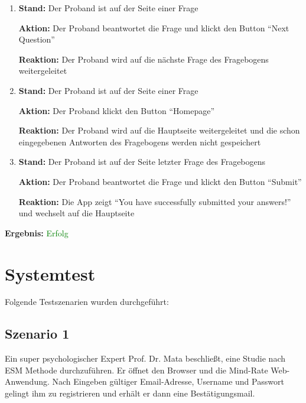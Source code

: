 \documentclass[a4paper]{scrreprt}
\begin{document}
\begin{itemize}
\begin{enumerate}
	        	        \item \par \textbf{Stand: }Der Proband ist auf der Seite einer Frage
	        	        \par \textbf{Aktion: }Der Proband beantwortet die Frage und klickt den Button ``Next Question''
	        	        \par \textbf{Reaktion: }Der Proband wird auf die nächste Frage des Fragebogens weitergeleitet
	        	        \item \par \textbf{Stand: }Der Proband ist auf der Seite einer Frage
	        	        \par \textbf{Aktion: }Der Proband klickt den Button ``Homepage''
	        	        \par \textbf{Reaktion: }Der Proband wird auf die Hauptseite weitergeleitet und die schon eingegebenen Antworten des Fragebogens werden nicht gespeichert
	        	        \item \par \textbf{Stand: }Der Proband ist auf der Seite letzter Frage des Fragebogens
	        	        \par \textbf{Aktion: }Der Proband beantwortet die Frage und klickt den Button ``Submit''
	        	        \par \textbf{Reaktion: }Die App zeigt ``You have successfully submitted your answers!'' und wechselt auf die Hauptseite
	              \end{enumerate}
                               \vspace*{0.3cm}
		      		           \par \textbf{Ergebnis: }\textcolor{green}{Erfolg}
		      		           \vspace*{0.6cm}  

              \end{itemize}
	
	
	  \newpage
	  \chapter{Systemtest}
	  Folgende Testszenarien wurden durchgef\"uhrt:
	

		\section{Szenario 1}
                \par Ein super psychologischer Expert Prof. Dr. Mata beschließt, eine Studie nach ESM Methode durchzuf\"uhren. Er \"offnet den Browser und die Mind-Rate Web-Anwendung. Nach Eingeben g\"ultiger Email-Adresse, Username und Passwort gelingt ihm zu registrieren und erh\"alt er dann eine Bestätigungsmail.
\end{document}
